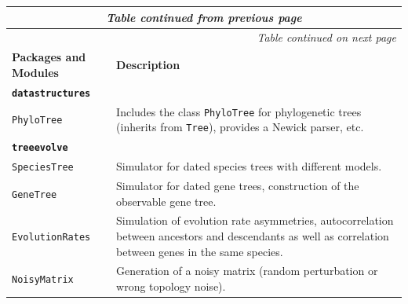 \documentclass[hidelinks,11pt]{article}
\begin{document}
{\footnotesize
\setlength{\tabcolsep}{6pt}
\renewcommand{\arraystretch}{1.4}
\begin{longtable}{| p{4.0cm} | p{10cm} |}
	\endfirsthead
	\multicolumn{2}{c}{\textit{Table continued from previous page}}\\
	\hline
	\endhead
	\hline \multicolumn{2}{r}{\textit{Table continued on next page}} \\
	\endfoot
	\hline
	\endlastfoot
	\hline
	\textbf{Packages and Modules} & \textbf{Description} \\
  \hline
  \multicolumn{2}{|l|}{\textbf{\texttt{datastructures}}}\\
  \hline
  \texttt{PhyloTree} &
  Includes the class \texttt{PhyloTree} for phylogenetic trees (inherits from 
  \texttt{Tree}), provides a Newick parser, etc. \\
	\hline
	\multicolumn{2}{|l|}{\textbf{\texttt{treeevolve}}}\\
	\hline
	\texttt{SpeciesTree} &
	Simulator for dated species trees with different models. \\
	\texttt{GeneTree} &
	Simulator for dated gene trees, construction of the observable gene tree. \\
	\texttt{EvolutionRates} &
	Simulation of evolution rate asymmetries, autocorrelation between ancestors and descendants as well as correlation between genes in the same species. \\
	\texttt{NoisyMatrix} &
	Generation of a noisy matrix (random perturbation or wrong topology noise). \\

\end{longtable}}
\end{document}
